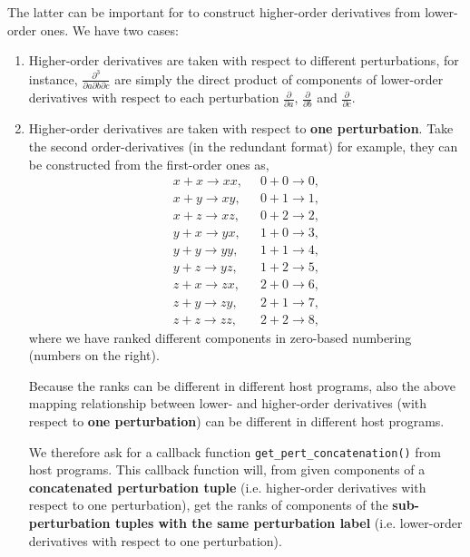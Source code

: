 The latter can be important for \LibName to construct higher-order derivatives
from lower-order ones. We have two cases:
\begin{enumerate}
  \item Higher-order derivatives are taken with respect to different
    perturbations, for instance, $\frac{\partial^{3}}{\partial a\partial b\partial c}$
    are simply the direct product of components of lower-order derivatives
    with respect to each perturbation $\frac{\partial}{\partial a}$,
    $\frac{\partial}{\partial b}$ and $\frac{\partial}{\partial c}$.
  \item Higher-order derivatives are taken with respect to
    \textbf{one perturbation}. Take the second order-derivatives (in the
    redundant format) for example, they can be constructed from the
    first-order ones as,
    \begin{align*}
      x+x\rightarrow xx,\;\; & 0+0\rightarrow 0,\\
      x+y\rightarrow xy,\;\; & 0+1\rightarrow 1,\\
      x+z\rightarrow xz,\;\; & 0+2\rightarrow 2,\\
      y+x\rightarrow yx,\;\; & 1+0\rightarrow 3,\\
      y+y\rightarrow yy,\;\; & 1+1\rightarrow 4,\\
      y+z\rightarrow yz,\;\; & 1+2\rightarrow 5,\\
      z+x\rightarrow zx,\;\; & 2+0\rightarrow 6,\\
      z+y\rightarrow zy,\;\; & 2+1\rightarrow 7,\\
      z+z\rightarrow zz,\;\; & 2+2\rightarrow 8,
    \end{align*}
    where we have ranked different components in zero-based numbering (numbers
    on the right).

    Because the ranks can be different in different host programs, also the
    above mapping relationship between lower- and higher-order derivatives
    (with respect to \textbf{one perturbation}) can be different in different
    host programs.

    We therefore ask for a callback function \texttt{get\_pert\_concatenation()}
    from host programs. This callback function will, from given components of
    a \textbf{concatenated perturbation tuple} (i.e. higher-order derivatives
    with respect to one perturbation), get the ranks of components of the
    \textbf{sub-perturbation tuples with the same perturbation label} (i.e.
    lower-order derivatives with respect to one perturbation).
\end{enumerate}

